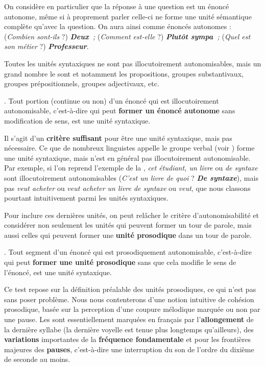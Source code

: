 On considère en particulier que la réponse à une question est un énoncé autonome, même si à proprement parler celle-ci ne forme une unité sémantique complète qu’avec la question. On aura ainsi comme énoncés autonomes : (\textit{Combien sont-ils} ?) \textbf{\textit{Deux~}}\textit{;} (\textit{Comment est-elle} ?) \textbf{\textit{Plutôt sympa~}}\textit{;} (\textit{Quel est son métier} ?) \textbf{\textit{Professeur}}.

Toutes les unités syntaxiques ne sont pas illocutoirement autonomisables, mais un grand nombre le sont et notamment les propositions, groupes substantivaux, groupes prépositionnels, groupes adjectivaux, etc.

\begin{styleLivreImportant}
. Tout portion (continue ou non) d’un énoncé qui est illocutoirement autonomisable, c’est-à-dire qui peut \textbf{former un énoncé autonome} sans modification de sens, est une unité syntaxique.
\end{styleLivreImportant}

Il s’agit d’un \textbf{critère suffisant} pour être une unité syntaxique, mais pas nécessaire. Ce que de nombreux linguistes appelle le groupe verbal (voir ) forme une unité syntaxique, mais n’est en général pas illocutoirement autonomisable. Par exemple, si l’on reprend l’exemple de la , \textit{cet étudiant, un livre} ou \textit{de syntaxe} sont illocutoirement autonomisables (\textit{C’est un livre de quoi} ? \textbf{\textit{De syntaxe}}), mais pas \textit{veut acheter} ou \textit{veut acheter un livre de syntaxe} ou \textit{veut}, que nous classons pourtant intuitivement parmi les unités syntaxiques.

Pour inclure ces dernières unités, on peut relâcher le critère d’autonomisabilité et considérer non seulement les unités qui peuvent former un tour de parole, mais aussi celles qui peuvent former une \textbf{unité prosodique} dans un tour de parole.

\begin{styleLivreImportant}
. Tout segment d’un énoncé qui est prosodiquement autonomisable, c’est-à-dire qui peut \textbf{former une unité prosodique} sans que cela modifie le sens de l’énoncé, est une unité syntaxique.
\end{styleLivreImportant}

Ce test repose sur la définition préalable des unités prosodiques, ce qui n’est pas sans poser problème. Nous nous contenterons d’une notion intuitive de cohésion prosodique, basée sur la perception d’une coupure mélodique marquée ou non par une pause. Les  sont essentiellement marquées en français par l’\textbf{allongement} de la dernière syllabe (la dernière voyelle est tenue plus longtemps qu’ailleurs), des \textbf{variations} importantes de la \textbf{fréquence fondamentale} et pour les frontières majeures des \textbf{pauses}, c’est-à-dire une interruption du son de l’ordre du dixième de seconde au moins.

